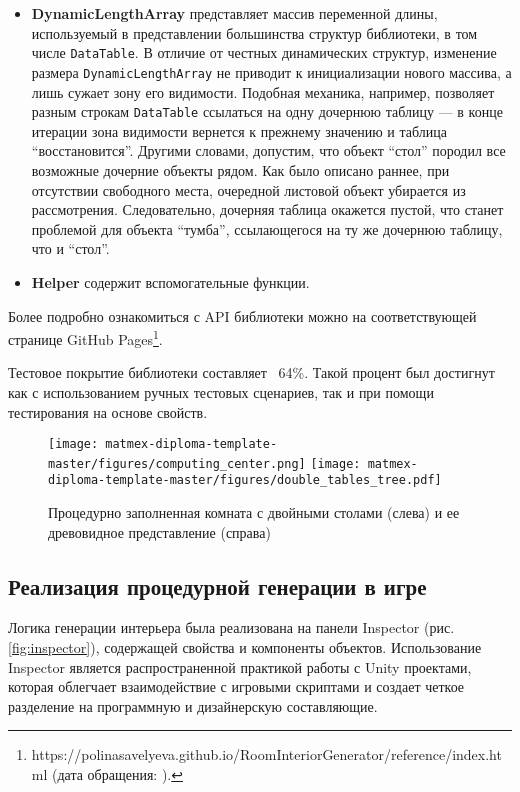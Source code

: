 \begin{itemize}
    \item \textbf{DynamicLengthArray} представляет массив переменной длины, используемый в представлении большинства структур библиотеки, в том числе \texttt{DataTable}. В отличие от честных динамических структур, изменение размера \texttt{DynamicLengthArray} не приводит к инициализации нового массива, а лишь сужает зону его видимости. Подобная механика, например, позволяет разным строкам \texttt{DataTable} ссылаться на одну дочернюю таблицу --- в конце итерации зона видимости вернется к прежнему значению и таблица \enquote{восстановится}. Другими словами, допустим, что объект \enquote{стол} породил все возможные дочерние объекты рядом. Как было описано раннее, при отсутствии свободного места, очередной листовой объект убирается из рассмотрения. Следовательно, дочерняя таблица окажется пустой, что станет проблемой для объекта \enquote{тумба}, ссылающегося на ту же дочернюю таблицу, что и \enquote{стол}. 
    
    \item \textbf{Helper} содержит вспомогательные функции.
    
\end{itemize}

Более подробно ознакомиться с API библиотеки можно на соответствующей странице GitHub Pages\footnote{https://polinasavelyeva.github.io/RoomInteriorGenerator/reference/index.html (дата обращения: ).}.

Тестовое покрытие библиотеки составляет ~64\%. Такой процент был достигнут как с использованием ручных тестовых сценариев, так и при помощи тестирования на основе свойств.

\begin{figure}
    \centering
    \texttt{[image: matmex-diploma-template-master/figures/computing\_center.png]}
    \texttt{[image: matmex-diploma-template-master/figures/double\_tables\_tree.pdf]}
    \caption{Процедурно заполненная комната с двойными столами (слева) и ее древовидное представление (справа)}
    \label{fig:double_table}
\end{figure}

\subsection{Реализация процедурной генерации в игре}

Логика генерации интерьера была реализована на панели Inspector (рис. \ref{fig:inspector}), содержащей свойства и компоненты объектов. Использование Inspector является распространенной практикой работы с Unity проектами, которая облегчает взаимодействие с игровыми скриптами и создает четкое разделение на программную и дизайнерскую составляющие. 

